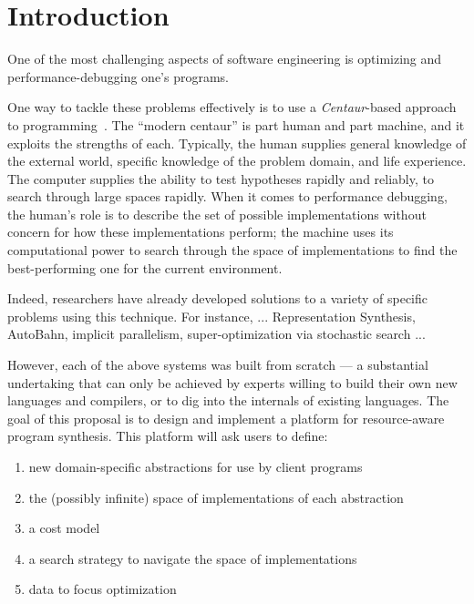 \section{Introduction}

One of the most challenging aspects of software engineering is
optimizing and performance-debugging one's programs.  

One way to tackle these problems effectively is to use a \emph{Centaur}-based 
approach to programming~\cite{centaur}.  The ``modern centaur'' is 
part human and part machine, and it exploits the strengths of each.
Typically, the human supplies general knowledge of the external world,
specific knowledge of the problem domain, and life experience.  The
computer supplies the ability to test hypotheses rapidly and reliably,
to search through large spaces rapidly.
When it comes to performance debugging, the human's role is to describe
the set of possible implementations without concern for how these implementations
perform; the machine uses its computational power to search through the space of 
implementations to find the best-performing one for the current environment.

Indeed, researchers have already developed solutions to a variety of specific problems
using this technique.  For instance, ... Representation Synthesis, AutoBahn, implicit
parallelism, super-optimization via stochastic search ...

However, each of the above systems was built from scratch --- a substantial undertaking
that can only be achieved by experts willing to build their own new languages and
compilers, or to dig into the internals of existing languages.  The goal of
this proposal is to design and implement a platform for resource-aware program
synthesis.  This platform will ask users to define:

\begin{enumerate}
\item new domain-specific abstractions for use by client programs
\item the (possibly infinite) space of implementations of each abstraction
\item a cost model
\item a search strategy to navigate the space of implementations
\item data to focus optimization
\end{enumerate}

